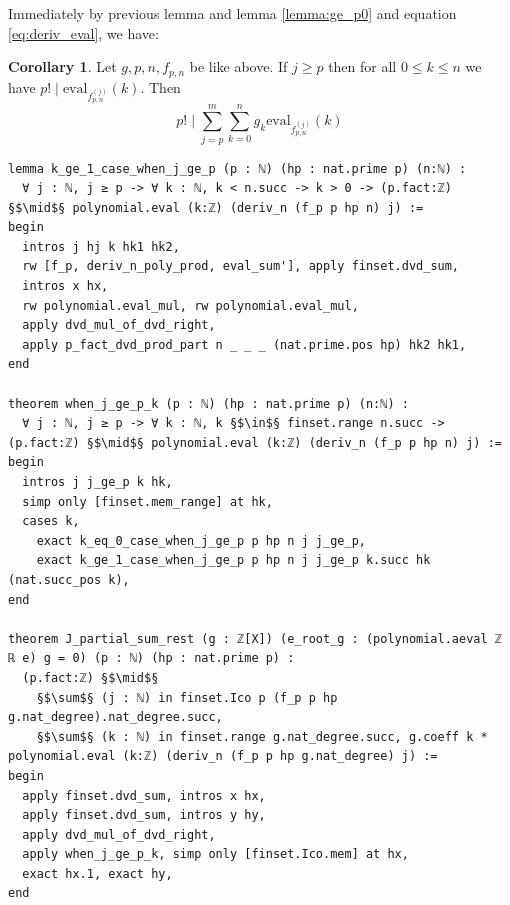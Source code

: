 \documentclass{report}
\theoremstyle{definition}
\newtheorem{corollary}{Corollary}[section]
\begin{document}
Immediately by previous lemma and lemma \ref{lemma:ge_p0} and equation \ref{eq:deriv_eval}, we have:
\begin{corollary}
Let $g,p,n,f_{p,n}$ be like above. If $j\ge p$ then for all $0\le k\le n$ we have $p!\mid\mathrm{eval}_{f_{p,n}^{(j)}}(k)$. Then
$$
p!\mid\sum_{j=p}^m\sum_{k=0}^n g_k\mathrm{eval}_{f_{p,n}^{(j)}}(k)
$$

\begin{verbatim}
lemma k_ge_1_case_when_j_ge_p (p : ℕ) (hp : nat.prime p) (n:ℕ) :
  ∀ j : ℕ, j ≥ p -> ∀ k : ℕ, k < n.succ -> k > 0 -> (p.fact:ℤ) §$\mid$§ polynomial.eval (k:ℤ) (deriv_n (f_p p hp n) j) := 
begin
  intros j hj k hk1 hk2,
  rw [f_p, deriv_n_poly_prod, eval_sum'], apply finset.dvd_sum, 
  intros x hx,
  rw polynomial.eval_mul, rw polynomial.eval_mul,
  apply dvd_mul_of_dvd_right,
  apply p_fact_dvd_prod_part n _ _ _ (nat.prime.pos hp) hk2 hk1,
end

theorem when_j_ge_p_k (p : ℕ) (hp : nat.prime p) (n:ℕ) :
  ∀ j : ℕ, j ≥ p -> ∀ k : ℕ, k §$\in$§ finset.range n.succ -> (p.fact:ℤ) §$\mid$§ polynomial.eval (k:ℤ) (deriv_n (f_p p hp n) j) :=
begin
  intros j j_ge_p k hk,
  simp only [finset.mem_range] at hk,
  cases k,
    exact k_eq_0_case_when_j_ge_p p hp n j j_ge_p,
    exact k_ge_1_case_when_j_ge_p p hp n j j_ge_p k.succ hk (nat.succ_pos k),
end

theorem J_partial_sum_rest (g : ℤ[X]) (e_root_g : (polynomial.aeval ℤ ℝ e) g = 0) (p : ℕ) (hp : nat.prime p) :
  (p.fact:ℤ) §$\mid$§ 
    §$\sum$§ (j : ℕ) in finset.Ico p (f_p p hp g.nat_degree).nat_degree.succ,
    §$\sum$§ (k : ℕ) in finset.range g.nat_degree.succ, g.coeff k * polynomial.eval (k:ℤ) (deriv_n (f_p p hp g.nat_degree) j) :=
begin
  apply finset.dvd_sum, intros x hx, 
  apply finset.dvd_sum, intros y hy,
  apply dvd_mul_of_dvd_right,
  apply when_j_ge_p_k, simp only [finset.Ico.mem] at hx, 
  exact hx.1, exact hy,
end
\end{verbatim}
\end{corollary}
\end{document}
